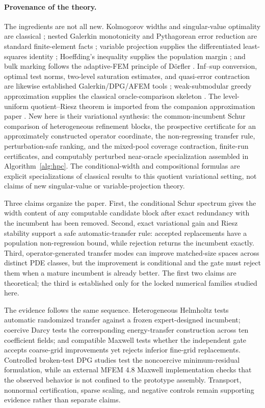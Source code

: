 \documentclass[11pt]{article}
\numberwithin{algorithm}{section}
\theoremstyle{definition}\newtheorem{definition}[theorem]{Definition}
\theoremstyle{remark}\newtheorem{remark}[theorem]{Remark}
\begin{document}
\paragraph{Provenance of the theory.}
The ingredients are not all new.  Kolmogorov widths and singular-value
optimality are classical \cite{kolmogorov1936,pinkus1985}; nested Galerkin
monotonicity and Pythagorean error reduction are standard finite-element
facts \cite{ciarlet1978}; variable projection supplies the differentiated
least-squares identity \cite{golubpereyra1973}; Hoeffding's inequality supplies
the population margin \cite{hoeffding1963}; and bulk marking follows the
adaptive-FEM principle of D\"orfler \cite{dorfler1996}.  Inf--sup conversion,
optimal test norms, two-level saturation estimates, and quasi-error
contraction are likewise established Galerkin/DPG/AFEM tools
\cite{demkowiczgopalakrishnan2011,casconetal2008,melenkwohlmuth2001};
weak-submodular greedy approximation supplies the classical oracle-comparison
skeleton \cite{elenbergetal2018}.  The level-uniform
quotient--Riesz theorem is imported from the companion approximation paper
\cite{dixon2026schurriesz}.  New here is their variational synthesis: the
common-incumbent Schur comparison of heterogeneous refinement blocks, the
prospective certificate for an approximately constructed operator coordinate,
the non-regressing transfer rule, perturbation-safe ranking, and the
mixed-pool coverage contraction, finite-run certificates, and computably
perturbed near-oracle specialization assembled in
Algorithm~\ref{alg:hpc}.  The conditional-width and compositional formulas are
explicit specializations of classical results to this quotient variational
setting, not claims of new singular-value or variable-projection theory.

Three claims organize the paper.  First, the conditional Schur spectrum gives
the width content of any computable candidate block after exact redundancy
with the incumbent has been removed.  Second, exact variational gain and Riesz
stability support a safe automatic-transfer rule: accepted replacements have a
population non-regression bound, while rejection returns the incumbent
exactly.  Third, operator-generated transfer modes can improve matched-size
spaces across distinct PDE classes, but the improvement is conditional and the
gate must reject them when a mature incumbent is already better.  The first two
claims are theoretical; the third is established only for the locked numerical
families studied here.

The evidence follows the same sequence.  Heterogeneous Helmholtz tests
automatic randomized transfer against a frozen expert-designed incumbent;
coercive Darcy tests the corresponding energy-transfer construction across ten
coefficient fields; and compatible Maxwell tests whether the independent gate
accepts coarse-grid improvements yet rejects inferior fine-grid replacements.
Controlled broken-test DPG studies test the noncoercive minimum-residual
formulation, while an external MFEM 4.8 Maxwell implementation checks that the
observed behavior is not confined to the prototype assembly.  Transport,
nonnormal certification, sparse scaling, and negative controls remain
supporting evidence rather than separate claims.
\end{document}
